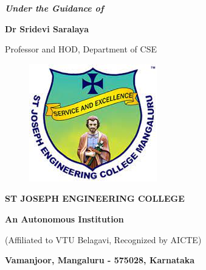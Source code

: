 \documentclass[12pt,a4paper]{report}
\begin{document}
\begin{center}
  \vspace{20pt}
  \textit{\textbf{Under the Guidance of}}
  \par
  \vspace{6pt}
  \textbf{Dr Sridevi Saralaya}
  \par
  \vspace{2pt}
  \normalsize { Professor and HOD, Department of CSE }
  \par
  \begin{figure}[hbtp]
    \centering
    \includegraphics[scale=0.6]{./pic/sjeclogo}
  \end{figure}
  \par \Large \textbf{ST JOSEPH ENGINEERING COLLEGE}
  \par
  \textbf{An Autonomous Institution}
  \par
  {\large{(Affiliated to VTU Belagavi, Recognized by AICTE)}}
  \par
  \vspace{3pt}
  {\large \textbf{Vamanjoor, Mangaluru - 575028, Karnataka}}
  \par
  \vspace{12pt}
\end{center}

\newpage
\pagestyle{plain}
\renewcommand{\contentsname}{\centering Table of Contents}
\tableofcontents
\newpage

\listoffigures
\end{document}
